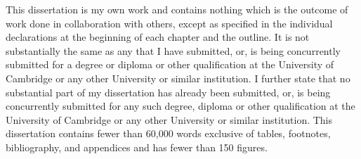
\begin{declaration}

This dissertation is my own work and contains nothing which is the outcome of work done in collaboration with others, except as specified in the individual declarations at the beginning of each chapter and the outline. It is not substantially the same as any that I have submitted, or, is being concurrently submitted for a degree or diploma or other qualification at the University of Cambridge or any other University or similar institution. I further state that no substantial part of my dissertation has already been submitted, or, is being concurrently submitted for any such degree, diploma or other qualification at the University of Cambridge or any other University or similar institution. This dissertation contains fewer than 60,000 words exclusive of tables, footnotes, bibliography, and appendices and has fewer than 150 figures.
\end{declaration}

